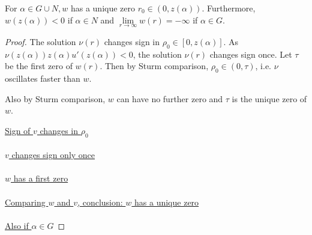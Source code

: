 \begin{lemma}\label{wq}For $\alpha\in G\cup N,w$ has a unique zero $r_0\in(0,z(\alpha)).$ Furthermore, $w(z(\alpha))<0$ if $\alpha\in N$ and $\underset{r\to\infty}{\lim}w(r)=-\infty$ if $\alpha\in G$.
\begin{proof} 
The solution $\nu(r)$ changes sign in $\rho_0\in[0,z(\alpha)]$. As $\nu(z(\alpha))z(\alpha)u'(z(\alpha))<0$, the solution $\nu(r)$ changes sign once. Let $\tau$ be the first zero of $w(r)$. Then by Sturm comparison, $\rho_0\in(0,\tau)$, i.e. $\nu$ oscillates faster than $w$. 

Also by Sturm comparison, $w$ can have no further zero and $\tau$ is the unique zero of $w$.

\underline{Sign of $v$ changes in $\rho_0$} \\ \\ 

\underline{$v$ changes sign only once} \\ \\  

\underline{$w$ has a first zero} \\ \\ 

\underline{Comparing $w$ and $v$, conclusion: $w$ has a unique zero} \\ \\ 

\underline{Also if $\alpha\in G$}


\end{proof} 
\end{lemma}
